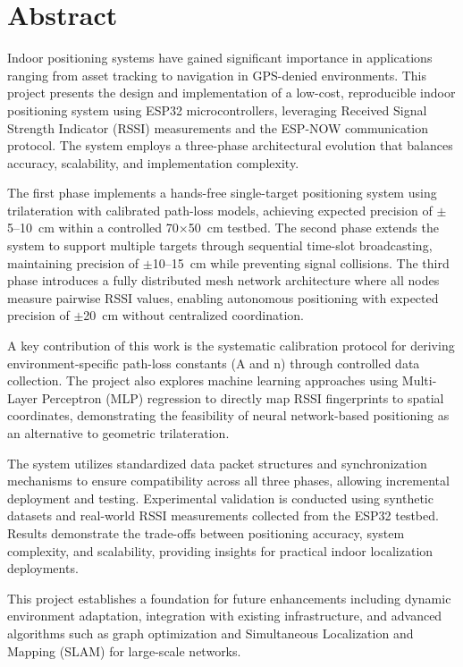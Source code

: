 \chapter{Abstract}
\onehalfspacing

Indoor positioning systems have gained significant importance in applications ranging from asset tracking to navigation in GPS-denied environments. This project presents the design and implementation of a low-cost, reproducible indoor positioning system using ESP32 microcontrollers, leveraging Received Signal Strength Indicator (RSSI) measurements and the ESP-NOW communication protocol. The system employs a three-phase architectural evolution that balances accuracy, scalability, and implementation complexity.\par

The first phase implements a hands-free single-target positioning system using trilateration with calibrated path-loss models, achieving expected precision of $\pm$5--10~cm within a controlled 70$\times$50~cm testbed. The second phase extends the system to support multiple targets through sequential time-slot broadcasting, maintaining precision of $\pm$10--15~cm while preventing signal collisions. The third phase introduces a fully distributed mesh network architecture where all nodes measure pairwise RSSI values, enabling autonomous positioning with expected precision of $\pm$20~cm without centralized coordination.\par

A key contribution of this work is the systematic calibration protocol for deriving environment-specific path-loss constants (A and n) through controlled data collection. The project also explores machine learning approaches using Multi-Layer Perceptron (MLP) regression to directly map RSSI fingerprints to spatial coordinates, demonstrating the feasibility of neural network-based positioning as an alternative to geometric trilateration.\par

The system utilizes standardized data packet structures and synchronization mechanisms to ensure compatibility across all three phases, allowing incremental deployment and testing. Experimental validation is conducted using synthetic datasets and real-world RSSI measurements collected from the ESP32 testbed. Results demonstrate the trade-offs between positioning accuracy, system complexity, and scalability, providing insights for practical indoor localization deployments.\par

This project establishes a foundation for future enhancements including dynamic environment adaptation, integration with existing infrastructure, and advanced algorithms such as graph optimization and Simultaneous Localization and Mapping (SLAM) for large-scale networks.
